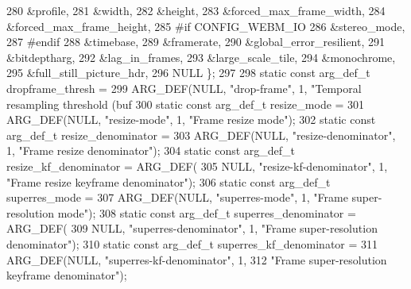 \begin{DoxyCodeInclude}
{{280                                           &profile,
281                                           &width,
282                                           &height,
283                                           &forced\_max\_frame\_width,
284                                           &forced\_max\_frame\_height,
285 \textcolor{preprocessor}{#if CONFIG\_WEBM\_IO}
286                                           &stereo\_mode,
287 \textcolor{preprocessor}{#endif}
288                                           &timebase,
289                                           &framerate,
290                                           &global\_error\_resilient,
291                                           &bitdeptharg,
292                                           &lag\_in\_frames,
293                                           &large\_scale\_tile,
294                                           &monochrome,
295                                           &full\_still\_picture\_hdr,
296                                           NULL \};
297 
298 \textcolor{keyword}{static} \textcolor{keyword}{const} arg\_def\_t dropframe\_thresh =
299     ARG\_DEF(NULL, \textcolor{stringliteral}{"drop-frame"}, 1, \textcolor{stringliteral}{"Temporal resampling threshold (buf %
300 \textcolor{keyword}{static} \textcolor{keyword}{const} arg\_def\_t resize\_mode =
301     ARG\_DEF(NULL, \textcolor{stringliteral}{"resize-mode"}, 1, \textcolor{stringliteral}{"Frame resize mode"});
302 \textcolor{keyword}{static} \textcolor{keyword}{const} arg\_def\_t resize\_denominator =
303     ARG\_DEF(NULL, \textcolor{stringliteral}{"resize-denominator"}, 1, \textcolor{stringliteral}{"Frame resize denominator"});
304 \textcolor{keyword}{static} \textcolor{keyword}{const} arg\_def\_t resize\_kf\_denominator = ARG\_DEF(
305     NULL, \textcolor{stringliteral}{"resize-kf-denominator"}, 1, \textcolor{stringliteral}{"Frame resize keyframe denominator"});
306 \textcolor{keyword}{static} \textcolor{keyword}{const} arg\_def\_t superres\_mode =
307     ARG\_DEF(NULL, \textcolor{stringliteral}{"superres-mode"}, 1, \textcolor{stringliteral}{"Frame super-resolution mode"});
308 \textcolor{keyword}{static} \textcolor{keyword}{const} arg\_def\_t superres\_denominator = ARG\_DEF(
309     NULL, \textcolor{stringliteral}{"superres-denominator"}, 1, \textcolor{stringliteral}{"Frame super-resolution denominator"});
310 \textcolor{keyword}{static} \textcolor{keyword}{const} arg\_def\_t superres\_kf\_denominator =
311     ARG\_DEF(NULL, \textcolor{stringliteral}{"superres-kf-denominator"}, 1,
312             \textcolor{stringliteral}{"Frame super-resolution keyframe denominator"});
}}}
\end{DoxyCodeInclude}
